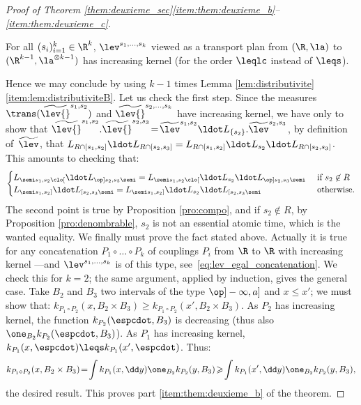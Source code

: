 \begin{proof}[Proof of Theorem \ref{them:deuxieme_sec}\eqref{item:them:deuxieme_b}--\eqref{item:them:deuxieme_c}]
\begin{fact}
For all $(s_i)_{i=1}^k\in\R^k$, $\lev^{s_1,\ldots,s_k}$ viewed as a transport plan from $(\R,\la)$ to $(\R^{k-1},\la^{\otimes k-1})$ has increasing kernel (for the order $\leqlc$ instead of $\leqs$).
\end{fact}

Hence we may conclude by using $k-1$ times Lemma \ref{lem:distributivite}\eqref{item:lem:distributiviteB}. Let us check the first step. Since the measures $\trans(\widetilde\lev{}^{s_1,s_2})$ and $\widetilde\lev{}^{s_2,\ldots,s_k}$ have increasing kernel, we have only to show that $\widetilde\lev{}^{s_1,s_2}.\widetilde\lev{}^{s_{2},s_3}\!=\!\widetilde{\lev}^{s_1,s_{2}}{}\ldot L_{\{s_{2}\}}.\widetilde{\lev}^{s_{2},s_3}$, \ie by definition of~$\widetilde\lev$, that $L_{R\cap[s_1,s_2]}{}\ldot L_{R\cap[s_2,s_3]}=L_{R\cap[s_1,s_2]}{}\ldot L_{s_2}{}\ldot L_{R\cap[s_2,s_3]}$. This amounts to checking that:\vspace*{-3pt}
\[
\begin{cases}
L_{\semi s_1,s_2\clo[}{}\ldot L_{\op]s_2,s_3\semi}=L_{\semi s_1,s_2\clo[}{}\ldot L_{s_2}{}\ldot L_{\op]s_2,s_3\semi}&\ \text{if}\ s_2\not\in R\\ L_{\semi s_1,s_2]}{}\ldot L_{[s_2,s_3\semi}=L_{\semi s_1,s_2]}{}\ldot L_{s_2}{}\ldot L_{[s_2,s_3\semi}&\ \text{otherwise.}\end{cases}
\]
The second point is true by Proposition \ref{pro:compo}, and if $s_2\not\in R$, by Proposition \ref{pro:denombrable}, $s_2$ is not an essential atomic time, which is the wanted equality. We finally must prove the fact stated above. Actually it is true for any concatenation $P_1\circ\ldots\circ P_k$ of couplings $P_i$ from $\R$ to $\R$ with increasing kernel —and $\lev^{s_1,\ldots,s_k}$ is of this type, see~\eqref{eq:lev_egal_concatenation}. We check this for $k=2$; the same argument, applied by induction, gives the general case. Take $B_2$ and $B_3$ two intervals of the type $\op]-\infty,a]$ and $x\leqslant x'$; we must show that: $k_{P_1\circ P_2}(x,B_2\times B_3)\geqslant k_{P_1\circ P_2}(x',B_2\times B_3)$. As $P_2$ has increasing kernel, the function $k_{P_2}(\espcdot,B_3)$ is decreasing (thus also $\one_{B_2}k_{P_2}(\espcdot,B_3)$). As $P_1$ has increasing kernel, $k_{P_1}(x,\espcdot)\leqs k_{P_1}(x',\espcdot)$. Thus:\vspace*{-3pt}
\[k_{P_1\circ P_2}(x,B_2\times B_3)\!=\!\int k_{P_1}(x,\dd y) \one_{B_2}k_{P_2}(y,B_3)\!\geqslant\! \int k_{P_1}(x',\dd y) \one_{B_2}k_{P_2}(y,B_3),\]
the desired result. This proves part \eqref{item:them:deuxieme_b} of the theorem.


\end{proof}
